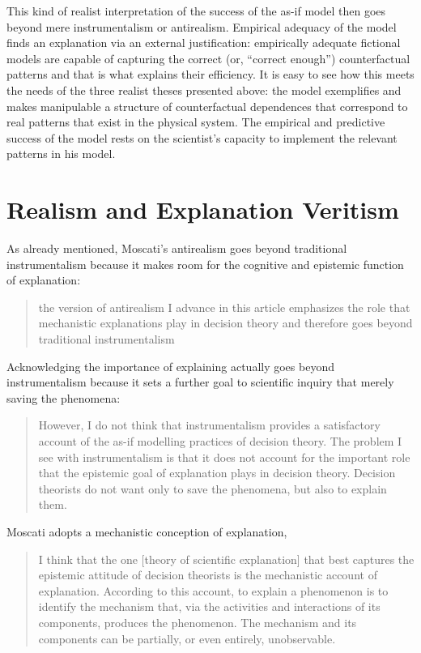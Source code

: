 \documentclass[a4paper,11pt]{article}
\theoremstyle{definition}
\begin{document}
This kind of realist interpretation of the success of the as-if model then goes beyond mere instrumentalism or antirealism. Empirical adequacy of the model finds an explanation via an external justification: empirically adequate fictional models are capable of capturing the correct (or, ``correct enough'') counterfactual patterns and that is what explains their efficiency. It is easy to see how this meets the needs of the three realist theses presented above: the model exemplifies and makes manipulable a structure of counterfactual dependences that correspond to real patterns that exist in the physical system. The empirical and predictive success of the model rests on the scientist's capacity to implement the relevant patterns in his model.

\section{Realism and Explanation Veritism}
\label{sec:expla}
As already mentioned, Moscati's antirealism goes beyond traditional instrumentalism because it makes room for the cognitive and epistemic function of explanation:

\begin{quote}
    the version of antirealism I advance in this article emphasizes the role that mechanistic explanations play in decision theory and therefore goes beyond traditional instrumentalism \citep[p.~4]{Moscati2023}
\end{quote}

Acknowledging the importance of explaining actually goes beyond instrumentalism because it sets a further goal to scientific inquiry that merely saving the phenomena:

\begin{quote}
    However, I do not think that instrumentalism provides a satisfactory account of the as-if modelling practices of decision theory. The problem I see with instrumentalism is that it does not account for the important role that the epistemic goal of explanation plays in decision theory. Decision theorists do not want only to save the phenomena, but also to explain them. \citep[p.~21]{Moscati2023}
\end{quote}

Moscati adopts a mechanistic conception of explanation,

\begin{quote}
    I think that the one [theory of scientific explanation] that best captures the epistemic attitude of decision theorists is the mechanistic account of explanation. According to this account, to explain a phenomenon is to identify the mechanism that, via the activities and interactions of its components, produces the phenomenon. The mechanism and its components can be partially, or even entirely, unobservable. \citep[p.~21]{Moscati2023}
\end{quote}
\end{document}

